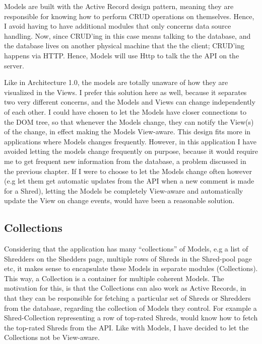 Models are built with the Active Record design pattern, meaning they are responsible for knowing how to perform CRUD operations on themselves. Hence, I avoid having to have additional modules that only concerns data source handling. Now, since CRUD'ing in this case means talking to the database, and the database lives on another physical machine that the the client; CRUD'ing happens via HTTP. Hence, Models will use Http to talk the the API on the server.  

Like in Architecture 1.0, the models are totally unaware of how they are visualized in the Views. I prefer this solution here as well, because it separates two very different concerns, and the Models and Views can change independently of each other. I could have chosen to let the Models have closer connections to the DOM tree, so that  whenever the Models change, they can notify the View(s) of the change, in effect making the Models View-aware. This design fits more in applications where Models changes frequently. However, in this application I have avoided letting the models change frequently on purpose, because it would require me to get frequent new information from the database, a problem discussed in the previous chapter. If I were to choose to let the Models change often however (e.g let them get automatic updates from the API when a new comment is made for a Shred), letting the Models be completely View-aware and automatically update the View on change events, would have been a reasonable solution. 

\subsection{Collections}
Considering that the application has many ``collections'' of Models, e.g a list of Shredders on the Shedders page, multiple rows of Shreds in the Shred-pool page etc, it makes sense to encapsulate these Models in separate modules (Collections). This way, a Collection is a container for multiple coherent Models. The motivation for this, is that the Collections can also work as Active Records, in that they can be responsible for fetching a particular set of Shreds or Shredders from the database, regarding the collection of Models they control. For example a Shred-Collection representing a row of top-rated Shreds, would know how to fetch the top-rated Shreds from the API. Like with Models, I have decided to let the Collections not be View-aware.

